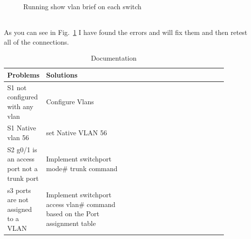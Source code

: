 \documentclass[../EngineeringJournal_CDavis.tex]{subfiles}
\begin{document}
\begin{figure}[!b]\centering
{}\par 
{}\hfill
{}
\caption{ Running show vlan brief on each switch }\label{Vlan12}
\end{figure}

\clearpage

\noindent{}\\
As you can see in Fig.~\ref{tab:Doc12} I have found the errors and will fix
them and then retest all of the connections.


\begin{table}[!h]
  \caption{Documentation}\label{tab:Doc12}
    \begin{tabular}{lp{0.45\linewidth}| lp{0.45\linewidth}p{1in}}
      \textbf{Problems} & \textbf{Solutions}\\\hline
      S1 not configured with any vlan & Configure Vlans\\
      S1 Native vlan 56 & set Native VLAN 56\\
      S2 g0/1 is an access port not a trunk port & Implement switchport mode\#
      trunk command\\
      s3 ports are not assigned to a VLAN & Implement switchport access vlan\#
      command based on the Port assignment table\\
    \end{tabular}
\end{table}
\end{document}
